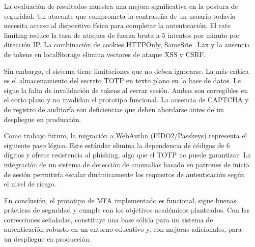 \documentclass[12pt,letterpaper]{article}
\begin{document}
La evaluaci\'on de resultados muestra una mejora significativa en la postura de seguridad. Un atacante que comprometa la contrase\~na de un usuario todav\'ia necesita acceso al dispositivo f\'isico para completar la autenticaci\'on. El rate limiting reduce la tasa de ataques de fuerza bruta a 5 intentos por minuto por direcci\'on IP. La combinaci\'on de cookies HTTPOnly, SameSite=Lax y la ausencia de tokens en localStorage elimina vectores de ataque XSS y CSRF.

Sin embargo, el sistema tiene limitaciones que no deben ignorarse. La m\'as cr\'itica es el almacenamiento del secreto TOTP en texto plano en la base de datos. Le sigue la falta de invalidaci\'on de tokens al cerrar sesi\'on. Ambas son corregibles en el corto plazo y no invalidan el prototipo funcional. La ausencia de CAPTCHA y de registro de auditor\'ia son deficiencias que deben abordarse antes de un despliegue en producci\'on.

Como trabajo futuro, la migraci\'on a WebAuthn (FIDO2/Passkeys) representa el siguiente paso l\'ogico. Este est\'andar elimina la dependencia de c\'odigos de 6 d\'igitos y ofrece resistencia al phishing, algo que el TOTP no puede garantizar. La integraci\'on de un sistema de detecci\'on de anomal\'ias basado en patrones de inicio de sesi\'on permitir\'ia escalar din\'amicamente los requisitos de autenticaci\'on seg\'un el nivel de riesgo.

En conclusi\'on, el prototipo de MFA implementado es funcional, sigue buenas pr\'acticas de seguridad y cumple con los objetivos acad\'emicos planteados. Con las correcciones se\~naladas, constituye una base s\'olida para un sistema de autenticaci\'on robusto en un entorno educativo y, con mejoras adicionales, para un despliegue en producci\'on.
\end{document}
